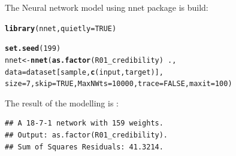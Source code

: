 \documentclass{article}\usepackage[]{graphicx}\usepackage[]{color}
\makeatletter
\newcommand{\hlnum}[1]{\textcolor[rgb]{0.686,0.059,0.569}{#1}}%
\newcommand{\hlopt}[1]{\textcolor[rgb]{0,0,0}{#1}}%
\newcommand{\hlstd}[1]{\textcolor[rgb]{0.345,0.345,0.345}{#1}}%
\newcommand{\hlkwb}[1]{\textcolor[rgb]{0.69,0.353,0.396}{#1}}%
\newcommand{\hlkwc}[1]{\textcolor[rgb]{0.333,0.667,0.333}{#1}}%
\newcommand{\hlkwd}[1]{\textcolor[rgb]{0.737,0.353,0.396}{\textbf{#1}}}%
\newenvironment{kframe}{%
 \def\at@end@of@kframe{}%
 \ifinner\ifhmode%
  \def\at@end@of@kframe{\end{minipage}}%
  \begin{minipage}{\columnwidth}%
 \fi\fi%
 \def\FrameCommand##1{\hskip\@totalleftmargin \hskip-\fboxsep
 \colorbox{shadecolor}{##1}\hskip-\fboxsep
     \hskip-\linewidth \hskip-\@totalleftmargin \hskip\columnwidth}%
 \MakeFramed {\advance\hsize-\width
   \@totalleftmargin\z@ \linewidth\hsize
   \@setminipage}}%
 {\par\unskip\endMakeFramed%
 \at@end@of@kframe}
\newenvironment{knitrout}{}{} %
\makeatother
\begin{document}
The Neural network model using nnet package is build:
\begin{knitrout}
\color{fgcolor}\begin{kframe}
\begin{alltt}
\hlkwd{library}\hlstd{(nnet,} \hlkwc{quietly}\hlstd{=}\hlnum{TRUE}\hlstd{)}

\hlkwd{set.seed}\hlstd{(}\hlnum{199}\hlstd{)}
\hlstd{nnet} \hlkwb{<-} \hlkwd{nnet}\hlstd{(}\hlkwd{as.factor}\hlstd{(R01_credibility)} \hlopt{~} \hlstd{.,}
                 \hlkwc{data}\hlstd{=dataset[sample,}\hlkwd{c}\hlstd{(input, target)],}
                 \hlkwc{size}\hlstd{=}\hlnum{7}\hlstd{,} \hlkwc{skip}\hlstd{=}\hlnum{TRUE}\hlstd{,} \hlkwc{MaxNWts}\hlstd{=}\hlnum{10000}\hlstd{,} \hlkwc{trace}\hlstd{=}\hlnum{FALSE}\hlstd{,} \hlkwc{maxit}\hlstd{=}\hlnum{100}\hlstd{)}
\end{alltt}
\end{kframe}
\end{knitrout}
The result of the modelling is :
\begin{knitrout}
\color{fgcolor}\begin{kframe}
\begin{verbatim}
## A 18-7-1 network with 159 weights.
## Output: as.factor(R01_credibility).
## Sum of Squares Residuals: 41.3214.
\end{verbatim}
\end{kframe}
\end{knitrout}
\end{document}
